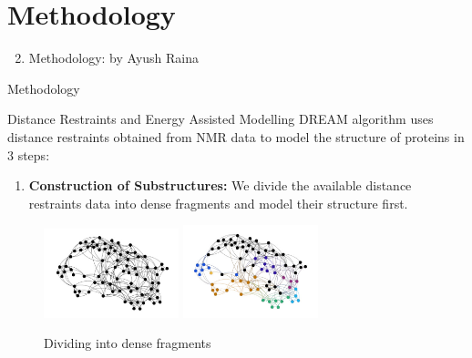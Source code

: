 \section*{Methodology}

\begin{frame}
    \begin{enumerate}
        \setcounter{enumi}{1}
        \item Methodology: by Ayush Raina
    \end{enumerate}
\end{frame}

\begin{frame}{Methodology}
    \begin{block}{Distance Restraints and Energy Assisted Modelling}
        DREAM algorithm uses distance restraints obtained from NMR data to model the structure of proteins in 3 steps:
        \begin{enumerate}
            \item \textbf{Construction of Substructures:} We divide the available distance restraints data into dense fragments and model their structure first.
        \end{enumerate}
        \pause
        \begin{figure}[h]
            \centering
            \includegraphics[width=0.35\textwidth]{images/single.png}
            \pause
            \includegraphics[width=0.35\textwidth]{images/separate.png}
            \caption{Dividing into dense fragments}
            \label{fig:my_label}
        \end{figure}
    \end{block}
\end{frame}

